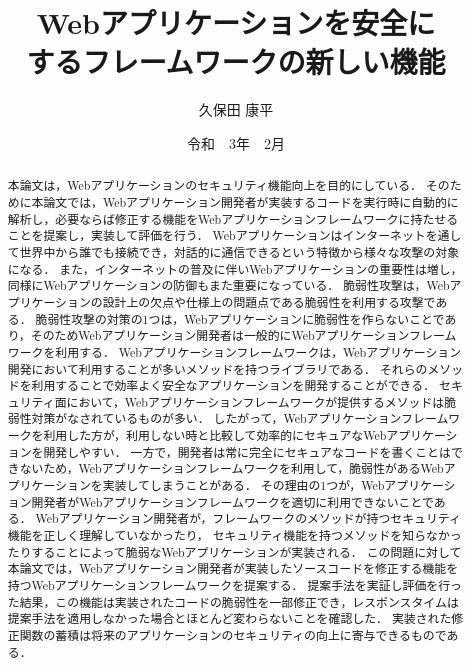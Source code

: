 \documentclass[a4paper,12pt]{jreport}
\title{Webアプリケーションを安全に\\するフレームワークの新しい機能}
\author{久保田 康平}
\date{令和　3年　2月}
\begin{document}
\maketitle

\begin{abstract}
本論文は，Webアプリケーションのセキュリティ機能向上を目的にしている．
そのために本論文では，Webアプリケーション開発者が実装するコードを実行時に自動的に解析し，必要ならば修正する機能をWebアプリケーションフレームワーク\cite{weinberger2011systematic, bottle, flask}に持たせることを提案し，実装して評価を行う．
Webアプリケーションはインターネットを通して世界中から誰でも接続でき，対話的に通信できるという特徴から様々な攻撃の対象になる．
また，インターネットの普及に伴いWebアプリケーションの重要性は増し，同様にWebアプリケーションの防御もまた重要になっている．
脆弱性攻撃は，Webアプリケーションの設計上の欠点や仕様上の問題点である脆弱性を利用する攻撃である．
脆弱性攻撃の対策の1つは，Webアプリケーションに脆弱性を作らないことであり，そのためWebアプリケーション開発者は一般的にWebアプリケーションフレームワークを利用する．
Webアプリケーションフレームワークは，Webアプリケーション開発において利用することが多いメソッドを持つライブラリである．
それらのメソッドを利用することで効率よく安全なアプリケーションを開発することができる．
セキュリティ面において，Webアプリケーションフレームワークが提供するメソッドは脆弱性対策がなされているものが多い．
したがって，Webアプリケーションフレームワークを利用した方が，利用しない時と比較して効率的にセキュアなWebアプリケーションを開発しやすい．
一方で，開発者は常に完全にセキュアなコードを書くことはできないため，Webアプリケーションフレームワークを利用して，脆弱性があるWebアプリケーションを実装してしまうことがある．
その理由の1つが，Webアプリケーション開発者がWebアプリケーションフレームワークを適切に利用できないことである．
Webアプリケーション開発者が，フレームワークのメソッドが持つセキュリティ機能を正しく理解していなかったり，
セキュリティ機能を持つメソッドを知らなかったりすることによって脆弱なWebアプリケーションが実装される．
この問題に対して本論文では，Webアプリケーション開発者が実装したソースコードを修正する機能を持つWebアプリケーションフレームワークを提案する．
提案手法を実証し評価を行った結果，この機能は実装されたコードの脆弱性を一部修正でき，レスポンスタイムは提案手法を適用しなかった場合とほとんど変わらないことを確認した．
実装された修正関数の蓄積は将来のアプリケーションのセキュリティの向上に寄与できるものである．
\end{abstract}

\tableofcontents
\listoffigures
\newpage
{}
\end{document}
